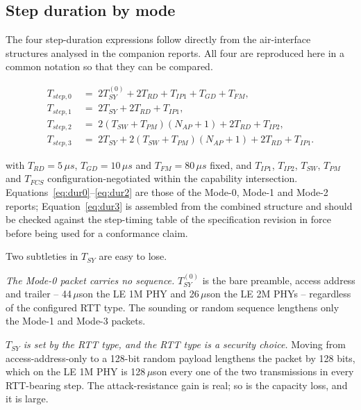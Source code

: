 \documentclass[11pt,a4paper]{article}
\newcommand{\us}{\,\ensuremath{\upmu}s}
\newcommand{\Tsy}{T_{SY}}
\newcommand{\Trd}{T_{RD}}
\newcommand{\Tip}{T_{IP1}}
\newcommand{\Tipp}{T_{IP2}}
\newcommand{\Tfcs}{T_{FCS}}
\newcommand{\Tgd}{T_{GD}}
\newcommand{\Tfm}{T_{FM}}
\newcommand{\Tsw}{T_{SW}}
\newcommand{\Tpm}{T_{PM}}
\newcommand{\Nap}{N_{AP}}
\providecommand{\upmu}{\mu}
\begin{document}
\subsection{Step duration by mode}

The four step-duration expressions follow directly from the air-interface structures analysed in the
companion reports. All four are reproduced here in a common notation so that they can be compared.

\begin{align}
T_{step,0} \;&=\; 2\Tsy^{(0)} + 2\Trd + \Tip + \Tgd + \Tfm, \label{eq:dur0}\\
T_{step,1} \;&=\; 2\Tsy + 2\Trd + \Tip, \label{eq:dur1}\\
T_{step,2} \;&=\; 2(\Tsw+\Tpm)(\Nap+1) + 2\Trd + \Tipp, \label{eq:dur2}\\
T_{step,3} \;&=\; 2\Tsy + 2(\Tsw+\Tpm)(\Nap+1) + 2\Trd + \Tip. \label{eq:dur3}
\end{align}

with $\Trd = 5\us$, $\Tgd = 10\us$ and $\Tfm = 80\us$ fixed, and $\Tip$, $\Tipp$, $\Tsw$, $\Tpm$ and
$\Tfcs$ configuration-negotiated within the capability intersection.
Equations~\eqref{eq:dur0}--\eqref{eq:dur2} are those of the Mode-0, Mode-1 and Mode-2 reports;
Equation~\eqref{eq:dur3} is assembled from the combined structure and should be checked against the
step-timing table of the specification revision in force before being used for a conformance claim.

Two subtleties in $\Tsy$ are easy to lose.

\emph{The Mode-0 packet carries no sequence.} $\Tsy^{(0)}$ is the bare preamble, access address and
trailer -- 44\us on the LE 1M PHY and 26\us on the LE 2M PHYs -- regardless of the configured RTT
type. The sounding or random sequence lengthens only the Mode-1 and Mode-3 packets.

\emph{$\Tsy$ is set by the RTT type, and the RTT type is a security choice.} Moving from
access-address-only to a 128-bit random payload lengthens the packet by 128 bits, which on the LE 1M
PHY is 128\us on every one of the two transmissions in every RTT-bearing step. The attack-resistance
gain is real; so is the capacity loss, and it is large.
\end{document}
